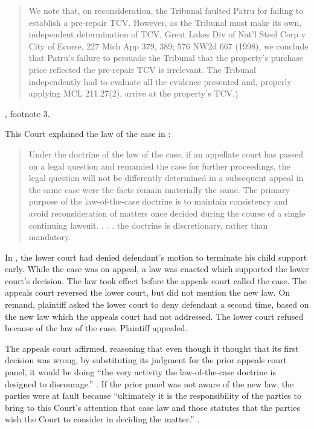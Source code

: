 \documentclass[12pt,\documentclassflag]{michiganCourtOfAppealsBrief}
\begin{document}
\begin{quote}
 We note that, on reconsideration, the Tribunal faulted Patru for failing to establish a pre-repair
TCV. However, as the Tribunal must make its own, independent determination of TCV, Great
Lakes Div of Nat'l Steel Corp v City of Ecorse, 227 Mich App 379, 389; 576 NW2d 667 (1998),
we conclude that Patru's failure to persuade the Tribunal that the property's purchase price
reflected the pre-repair TCV is irrelevant. The Tribunal independently had to evaluate all the
evidence presented and, properly applying MCL 211.27(2), arrive at the property's TCV.)
\end{quote}
, footnote 3.

This Court explained the law of the case in :

\begin{quote}
  Under the doctrine of the law of the case, if an appellate court has passed on a legal question and remanded the case for further proceedings, the legal question will not be differently determined in a subsequent appeal in the same case were the facts remain materially the same. The primary purpose of the law-of-the-case doctrine is to maintain consistency and avoid reconsideration of matters once decided during the course of a single  %
  continuing lawsuit. . . .  the doctrine is discretionary, rather than mandatory.
\end{quote}

In \cite[s]{Bennett}, the lower court had denied defendant's motion to terminate his child support early.
While the case was on appeal, a law was enacted which supported the lower court's decision. The law took effect before the appeals court called the case. The appeals court reversed the lower court, but did not mention the new law. On remand, plaintiff asked the lower court to deny defendant a second time, based on the new law which the appeals court had not addressed. The lower court refused because of the law of the case. Plaintiff appealed.

The appeals court affirmed, reasoning that even though it thought that its first decision was wrong, by substituting its judgment for the prior appeals court panel, it would be doing ``the very activity the law-of-the-case doctrine is designed to discourage.'' . If the prior panel was not aware of the new law, the parties were at fault because ``ultimately it is the responsibility of the parties to bring to this Court's attention that case law and those statutes that the parties wish the Court to consider in deciding the matter.'' .
\end{document}
